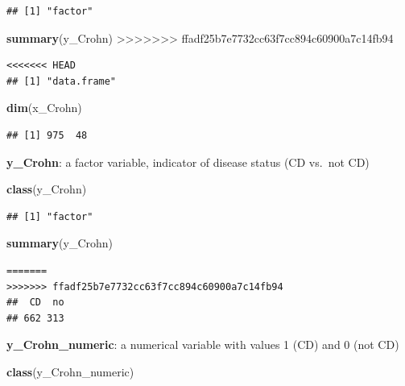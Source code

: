 \documentclass[openany]{book}
\newenvironment{Shaded}{\begin{snugshade}}{\end{snugshade}}
\newcommand{\KeywordTok}[1]{\textcolor[rgb]{0.13,0.29,0.53}{\textbf{#1}}}
\newcommand{\NormalTok}[1]{#1}
\begin{document}
\begin{verbatim}
## [1] "factor"
\end{verbatim}

\begin{Shaded}
\begin{Highlighting}[]
\KeywordTok{summary}\NormalTok{(y_Crohn)}
>>>>>>> ffadf25b7e7732cc63f7cc894c60900a7c14fb94
\end{Highlighting}
\end{Shaded}

\begin{verbatim}
<<<<<<< HEAD
## [1] "data.frame"
\end{verbatim}

\begin{Shaded}
\begin{Highlighting}[]
\KeywordTok{dim}\NormalTok{(x_Crohn)}
\end{Highlighting}
\end{Shaded}

\begin{verbatim}
## [1] 975  48
\end{verbatim}

\textbf{y\_Crohn}: a factor variable, indicator of disease status (CD
vs.~not CD)

\begin{Shaded}
\begin{Highlighting}[]
\KeywordTok{class}\NormalTok{(y_Crohn)}
\end{Highlighting}
\end{Shaded}

\begin{verbatim}
## [1] "factor"
\end{verbatim}

\begin{Shaded}
\begin{Highlighting}[]
\KeywordTok{summary}\NormalTok{(y_Crohn)}
\end{Highlighting}
\end{Shaded}

\begin{verbatim}
=======
>>>>>>> ffadf25b7e7732cc63f7cc894c60900a7c14fb94
##  CD  no 
## 662 313
\end{verbatim}

\textbf{y\_Crohn\_numeric}: a numerical variable with values 1 (CD) and
0 (not CD)

\begin{Shaded}
\begin{Highlighting}[]
\KeywordTok{class}\NormalTok{(y_Crohn_numeric)}
\end{Highlighting}
\end{Shaded}
\end{document}
